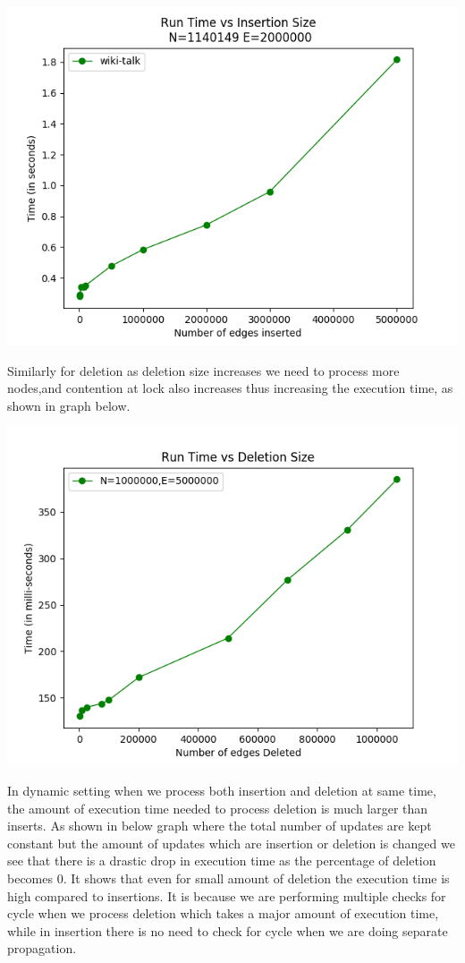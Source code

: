 \documentclass[a4paper]{article}
\begin{document}
\begin{center}
\includegraphics[scale=0.45]{img/IvK.png}        
\end{center}
Similarly for deletion as deletion size increases we need to process more nodes,and contention at lock also increases thus increasing the execution time, as shown in graph below.
\begin{center}
\includegraphics[scale=0.45]{img/DvT.png}        
\end{center}
In dynamic setting when we process both insertion and deletion at same time, the amount of execution time needed to process deletion is much larger than inserts. As shown in below graph where the total number of updates are kept constant but the amount of updates which are insertion or deletion is changed we see that there is a drastic drop in execution time as the percentage of deletion becomes 0. It shows that even for small amount of deletion the execution time is high compared to insertions. It is because we are performing multiple checks for cycle when we process deletion which takes a major amount of execution time, while in insertion there is no need to check for cycle when we are doing separate propagation.\\
\end{document}
